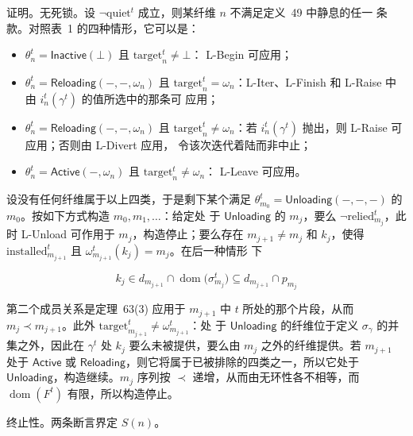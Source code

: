 证明。无死锁。设 \(\neg \mathrm{quiet}^{t}\) 成立，则某纤维 \(n\) 不满足定义~49 中静息的任一
条款。对照表~1 的四种情形，它可以是：

\begin{itemize}
\item
  \(\theta_{n}^{t} = \mathsf{Inactive}(\bot)\) 且 \(\mathrm{target}_{n}^{t} \neq \bot\)：
  L-Begin 可应用；
\item
  \(\theta_{n}^{t} = \mathsf{Reloading}(-,-,\omega_{n})\) 且 \(\mathrm{target}_{n}^{t} =
  \omega_{n}\)：L-Iter、L-Finish 和 L-Raise 中由 \(i_{n}^{t}(\gamma^{t})\) 的值所选中的那条可
  应用；
\item
  \(\theta_{n}^{t} = \mathsf{Reloading}(-,-,\omega_{n})\) 且 \(\mathrm{target}_{n}^{t} \neq
  \omega_{n}\)：若 \(i_{n}^{t}(\gamma^{t})\) 抛出，则 L-Raise 可应用；否则由 L-Divert 应用，
  令该次迭代着陆而非中止；
\item
  \(\theta_{n}^{t} = \mathsf{Active}(-,\omega_{n})\) 且 \(\mathrm{target}_{n}^{t} \neq \omega_{n}\)：
  L-Leave 可应用。
\end{itemize}

设没有任何纤维属于以上四类，于是剩下某个满足 \(\theta_{m_{0}}^{t} =
\mathsf{Unloading}(-,-,-)\) 的 \(m_{0}\)。按如下方式构造 \(m_{0}, m_{1}, \ldots\)：给定处
于 \(\mathsf{Unloading}\) 的 \(m_{j}\)，要么 \(\neg \mathrm{relied}_{m_{j}}^{t}\)，此时 L-Unload
可作用于 \(m_{j}\)，构造停止；要么存在 \(m_{j+1} \neq m_{j}\) 和 \(k_{j}\)，使得
\(\mathrm{installed}_{m_{j+1}}^{t}\) 且 \(\omega_{m_{j+1}}^{t}(k_{j}) = m_{j}\)。在后一种情形
下

\[
k_{j} \in d_{m_{j+1}} \cap \operatorname{dom}\Big(\sigma_{m_{j}}^{t}\Big) \subseteq d_{m_{j+1}} \cap p_{m_{j}}
\]

第二个成员关系是定理~63(3) 应用于 \(m_{j+1}\) 中 \(t\) 所处的那个片段，从而
\(m_{j} \prec m_{j+1}\)。此外 \(\mathrm{target}_{m_{j+1}}^{t} \neq \omega_{m_{j+1}}^{t}\)：处
于 \(\mathsf{Unloading}\) 的纤维位于定义 \(\sigma_{\gamma}\) 的并集之外，因此在 \(\gamma^{t}\)
处 \(k_{j}\) 要么未被提供，要么由 \(m_{j}\) 之外的纤维提供。若 \(m_{j+1}\) 处于
\(\mathsf{Active}\) 或 \(\mathsf{Reloading}\)，则它将属于已被排除的四类之一，所以它处于
\(\mathsf{Unloading}\)，构造继续。\(m_{j}\) 序列按 \(\prec\) 递增，从而由无环性各不相等，而
\(\operatorname{dom}(F^{t})\) 有限，所以构造停止。

终止性。两条断言界定 \(S(n)\)。

